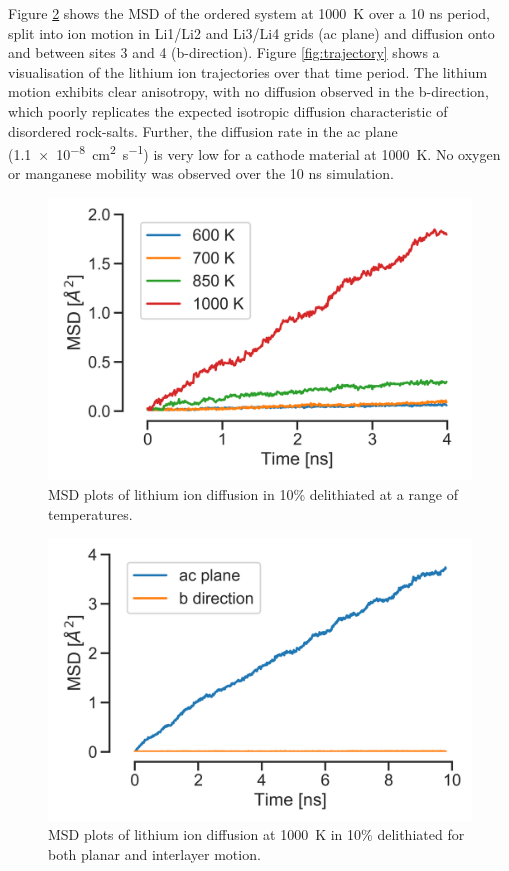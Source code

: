 Figure \ref{fig:msd1000} shows the MSD of the ordered  system at \SI{1000}{\kelvin} over a 10 ns period, split into ion motion in Li1/Li2 and Li3/Li4 grids (ac plane) and diffusion onto and between sites 3 and 4 (b-direction).
Figure \ref{fig:trajectory} shows a visualisation of the lithium ion trajectories over that time period.
The lithium motion exhibits clear anisotropy, with no diffusion observed in the b-direction, which poorly replicates the expected isotropic diffusion characteristic of disordered rock-salts.
Further, the diffusion rate in the ac plane (\SI{1.1e-8}{\centi\meter\squared\per\second}) is very low for a cathode material at \SI{1000}{\kelvin}. 
No oxygen or manganese mobility was observed over the 10 ns simulation.
\begin{figure}[p]
\centering
\includegraphics[width=0.8\linewidth]{figures/static/MSD_all}
\caption{MSD plots of lithium ion diffusion in 10\% delithiated  at a range of temperatures.}
\label{fig:msdall}
\end{figure}

\begin{figure}[p]
\centering
\includegraphics[width=0.8\linewidth]{figures/static/MSD_1000}
\caption{MSD plots of lithium ion diffusion at \SI{1000}{\kelvin} in 10\% delithiated  for both planar and interlayer motion.}
\label{fig:msd1000}
\end{figure}

